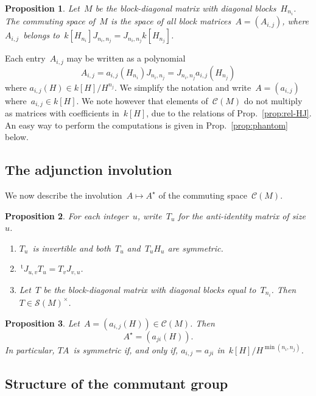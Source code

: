 \documentclass{article}%
\newtheorem{prop}{Proposition}
\let\ro\mathscr
\def\transpose{\,{}^{\mathrm{t}\!}}
\begin{document}
\begin{prop}\label{prop:structure-commutant}
Let~$M$ be the block-diagonal matrix with diagonal blocks~$H_{n_i}$.
The commuting space of~$M$ is the space of
all block matrices~$A = (A_{i,j})$, where $A_{i,j}$~belongs
to~$k[H_{n_i}] J_{n_{i}, n_{j}} = J_{n_i, n_j} k[H_{n_j}]$.
\end{prop}

Each entry~$A_{i,j}$ may be written as a polynomial
\begin{equation}
A_{i,j} = a_{i,j} (H_{n_i}) J_{n_i,n_j} = J_{n_i,n_j} a_{i,j} (H_{n_j})
\end{equation}
where $a_{i,j}(H) ∈ k[H]/H^{n_j}$.
We simplify the notation and write~$A = (a_{i,j})$ where~$a_{i,j} ∈
k[H]$. We note however that elements of~$\ro C(M)$ do not multiply as
matrices with coefficients in~$k[H]$, due to the relations
of Prop.~\ref{prop:rel-HJ}. An easy way to perform the computations is
given in Prop.~\ref{prop:phantom} below.

\subsection{The adjunction involution}%

We now describe the involution~$A ↦ A^{⋆}$ of the commuting space~$\ro
C(M)$.

\begin{prop}\label{prop:big-T}
For each integer~$u$, write~$T_u$ for the anti-identity matrix of
size~$u$.
\begin{enumerate}
\item $T_u$~is invertible and both~$T_u$ and~$T_u H_u$ are symmetric.
\item $\transpose{J_{u,v}} T_u = T_v J_{v,u}$.
\item Let~$T$ be the block-diagonal matrix with diagonal blocks equal
to~$T_{n_i}$. Then $T ∈ \ro S(M)^{×}$.
\end{enumerate}
\end{prop}


\begin{prop}
Let~$A = (a_{i,j}(H)) ∈ \ro C(M)$. Then \[ A^{⋆} = (a_{ji}(H)). \]
In particular, $TA$~is symmetric if, and only if, $a_{i,j} = a_{ji}$
in~$k[H]/H^{\min (n_i, n_j)}$.
\end{prop}

\subsection{Structure of the commutant group}%
\end{document}
